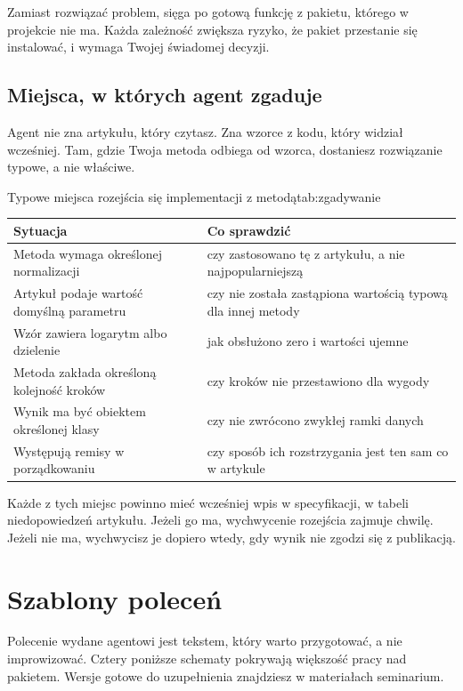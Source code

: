 Zamiast rozwiązać problem, sięga po gotową funkcję z pakietu, którego w projekcie nie ma. Każda zależność zwiększa ryzyko, że pakiet przestanie się instalować, i wymaga Twojej świadomej decyzji.

\subsection{Miejsca, w których agent zgaduje}

Agent nie zna artykułu, który czytasz. Zna wzorce z kodu, który widział wcześniej. Tam, gdzie Twoja metoda odbiega od wzorca, dostaniesz rozwiązanie typowe, a nie właściwe.

\begin{tabelaepi}{Typowe miejsca rozejścia się implementacji z metodą}{tab:zgadywanie}
\begin{tabular}{@{}p{6.4cm}p{6.8cm}@{}}
\toprule
Sytuacja & Co sprawdzić \\
\midrule
Metoda wymaga określonej normalizacji & czy zastosowano tę z artykułu, a nie najpopularniejszą \\
Artykuł podaje wartość domyślną parametru & czy nie została zastąpiona wartością typową dla innej metody \\
Wzór zawiera logarytm albo dzielenie & jak obsłużono zero i wartości ujemne \\
Metoda zakłada określoną kolejność kroków & czy kroków nie przestawiono dla wygody \\
Wynik ma być obiektem określonej klasy & czy nie zwrócono zwykłej ramki danych \\
Występują remisy w porządkowaniu & czy sposób ich rozstrzygania jest ten sam co w artykule \\
\bottomrule
\end{tabular}
\end{tabelaepi}

Każde z tych miejsc powinno mieć wcześniej wpis w specyfikacji, w tabeli niedopowiedzeń artykułu. Jeżeli go ma, wychwycenie rozejścia zajmuje chwilę. Jeżeli nie ma, wychwycisz je dopiero wtedy, gdy wynik nie zgodzi się z publikacją.

\section{Szablony poleceń}

Polecenie wydane agentowi jest tekstem, który warto przygotować, a nie improwizować. Cztery poniższe schematy pokrywają większość pracy nad pakietem. Wersje gotowe do uzupełnienia znajdziesz w materiałach seminarium.

